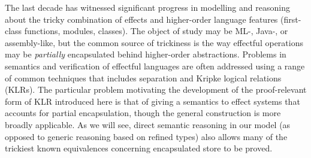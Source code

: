 \documentclass[orivec]{llncs}
\makeatletter
\renewcommand{\section}{\@startsection{section}{1}{\z@}{-10\p@ \@plus -4\p@ \@minus -4\p@}{5\p@ \@plus 4\p@ \@minus 4\p@}{\normalfont\bfseries\boldmath\rightskip=\z@ \@plus 8em\pretolerance=10000 }}
\newcommand{\squelch}[1]{}
\makeatother
\begin{document}
\section{Introduction}
\label{sec:intro}
The last decade has witnessed significant progress in modelling and
reasoning about the tricky combination of effects and higher-order
language features (first-class functions, modules, classes).  The
object of study may be ML-, Java-, or assembly-like, but the common
source of trickiness is the way effectful operations may be
\emph{partially} encapsulated behind higher-order
abstractions. Problems in semantics and verification of effectful
languages are often addressed using a range of common techniques that
includes separation and Kripke logical relations (KLRs). The
particular problem motivating the development of the proof-relevant
form of KLR introduced here is that of giving a semantics to effect
systems that accounts for partial encapsulation, though the general
construction is more broadly applicable. As we will see, direct
semantic reasoning in our model (as opposed to generic reasoning based
on refined types) also allows many of the trickiest known equivalences
concerning encapsulated store to be proved.

\squelch{One is to devise models and reasoning principles for establishing
contextual (in)equivalences
\cite{DBLP:conf/mfcs/PittsS93,DBLP:journals/corr/abs-1103-0510}. A
second is to establish equivalence between high-level and low-level
code fragments, e.g. for compiler correctness
\cite{DBLP:conf/icfp/BentonH09,DBLP:conf/popl/HurD11}. A third is to
define Hoare-style logics for showing programs satisfy 
assertions \cite{DBLP:journals/corr/abs-1109-3031}. A fourth, which
we address here, is to study type systems and analyses that
can characterise particular \emph{classes} of behaviour (such as
purity) and be used to justify equivalences more generically.
}
\end{document}
